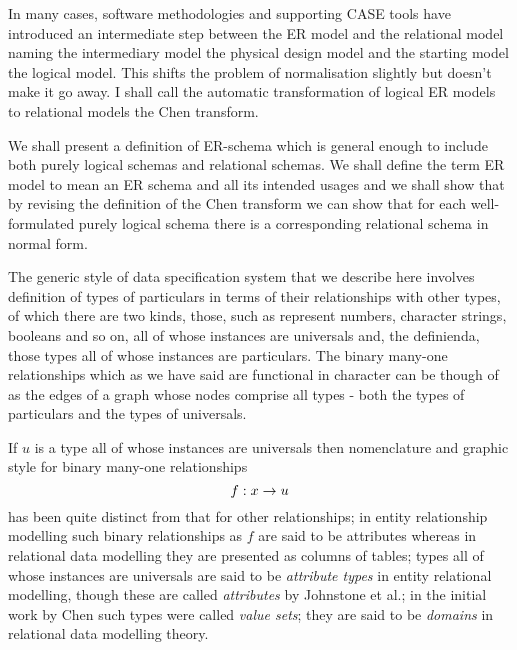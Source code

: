 In many cases, software methodologies and supporting CASE tools have introduced an intermediate step between the ER model and the relational model naming the intermediary model the physical design model and the starting model the logical
model. This shifts the problem of normalisation slightly but doesn't make it go away. I shall call the automatic transformation of logical ER models to relational models the Chen transform.  

We shall present a  definition of ER-schema which is general enough to include both purely logical schemas  and relational  schemas. We shall define the term ER model to mean an ER schema and all its intended usages and we shall show that by revising the definition of the Chen transform we can show that for each well-formulated purely logical schema there is a corresponding relational schema in normal form. 

\iffalse
The generic style of data specification system
that we describe here involves definition of types of particulars in terms of their relationships with other types,
of which there are two kinds, those, such as represent numbers, character strings, booleans and so on, all of
whose instances are universals and, the definienda, those types all of whose instances are particulars. The binary many-one relationships which as we have said are functional in character can be though of as the edges of a graph whose nodes comprise all types - both the types of particulars and the types of universals. 


If $u$ is a type all of whose instances are universals then 
nomenclature and graphic style for
binary many-one relationships
$$
f: x \rightarrow u
$$
 has been quite distinct from that for other relationships;
in entity relationship modelling such binary relationships as $f$
are said to be attributes whereas in relational data modelling they are presented as columns of tables; types all of whose instances are universals  are said to be \textit{attribute types} in entity relational 
modelling, though  these are called \textit{attributes} by Johnstone et al.; in the initial work by  Chen such types were called \textit{value sets}; they are said to be \textit{domains} in relational data modelling theory. 

